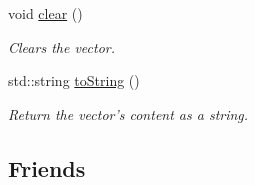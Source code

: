\begin{CompactItemize}
void \hyperlink{classgrassmann_1_1Vector_c43808ba1c06b8e502b6a4430c674bd4}{clear} ()
\begin{CompactList}\small\item\em Clears the vector. \item\end{CompactList}\item 
std::string \hyperlink{classgrassmann_1_1Vector_2101413da90bea7fd2c911342b48cb60}{toString} ()
\begin{CompactList}\small\item\em Return the vector's content as a string. \item\end{CompactList}\end{CompactItemize}
\subsection*{Friends}
